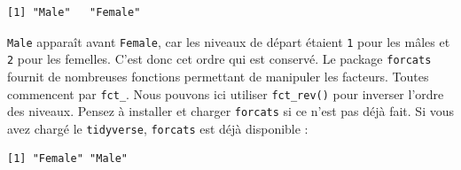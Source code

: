 \documentclass[
  a4paper,
]{article}
\newenvironment{Shaded}{\begin{snugshade}}{\end{snugshade}}
\newcommand{\DataTypeTok}[1]{\textcolor[rgb]{0.00,0.34,0.68}{#1}}
\newcommand{\KeywordTok}[1]{\textcolor[rgb]{0.12,0.11,0.11}{\textbf{#1}}}
\newcommand{\NormalTok}[1]{\textcolor[rgb]{0.12,0.11,0.11}{#1}}
\newcommand{\OperatorTok}[1]{\textcolor[rgb]{0.12,0.11,0.11}{#1}}
\newcommand{\OtherTok}[1]{\textcolor[rgb]{0.00,0.43,0.16}{#1}}
\newcommand{\StringTok}[1]{\textcolor[rgb]{0.75,0.01,0.01}{#1}}
\begin{document}
\begin{Shaded}
\end{Shaded}

\begin{verbatim}
[1] "Male"   "Female"
\end{verbatim}

\texttt{Male} apparaît avant \texttt{Female}, car les niveaux de départ étaient \texttt{1} pour les mâles et \texttt{2} pour les femelles. C'est donc cet ordre qui est conservé. Le package \texttt{forcats} fournit de nombreuses fonctions permettant de manipuler les facteurs. Toutes commencent par \texttt{fct\_}. Nous pouvons ici utiliser \texttt{fct\_rev()} pour inverser l'ordre des niveaux. Pensez à installer et charger \texttt{forcats} si ce n'est pas déjà fait. Si vous avez chargé le \texttt{tidyverse}, \texttt{forcats} est déjà disponible :

\begin{Shaded}
\end{Shaded}

\begin{verbatim}
[1] "Female" "Male"  
\end{verbatim}

\begin{Shaded}
\end{Shaded}
\end{document}
